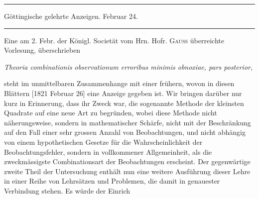 \par\bigskip
\begin{center}
\rule{.88\textwidth}{.3pt}\par
Göttingische gelehrte Anzeigen. Februar 24.\par
\rule{.88\textwidth}{.3pt}
\end{center}

Eine am 2. Febr. der Königl. Societät vom Hrn. Hofr. \textsc{Gauss} überreichte Vorlesung, überschrieben
\begin{center}
\textit{Theoria combinationis observationum erroribus minimis obnoxiae, pars posterior,}
\end{center}
\noindent steht im unmittelbaren Zusammenhange mit einer frühern, wovon in diesen Blättern [1821 Februar 26] eine Anzeige gegeben ist. Wir bringen darüber nur kurz in Erinnerung, dass ihr Zweck war, die sogenannte Methode der kleinsten Quadrate auf eine neue Art zu begründen, wobei diese Methode nicht näherungsweise, sondern in mathematischer Schärfe, nicht mit der Beschränkung auf den Fall einer sehr grossen Anzahl von Beobachtungen, und nicht abhängig von einem hypothetischen Gesetze für die Wahrscheinlichkeit der Beobachtungsfehler, sondern in vollkommener Allgemeinheit, als die zweckmässigste Combinationsart der Beobachtungen erscheint. Der gegenwärtige zweite Theil der Untersuchung enthält nun eine weitere Ausführung dieser Lehre in einer Reihe von Lehrsätzen und Problemen, die damit in genauester Verbindung stehen. Es würde der Einrich%
